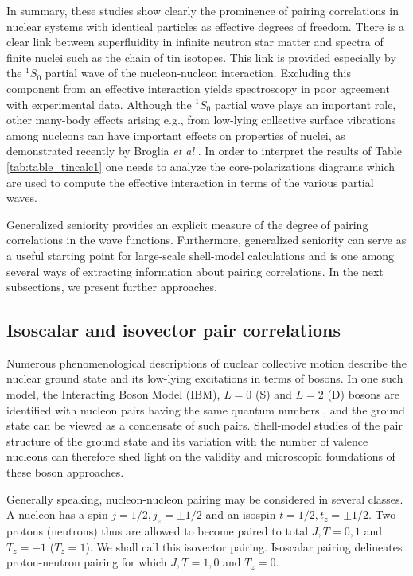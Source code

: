 \documentclass[rmp,aps,floatfix]{revtex4}
\begin{document}
In summary, these studies show clearly the prominence of pairing correlations
in nuclear systems with identical particles as effective degrees of freedom.
There is a clear link between superfluidity in infinite neutron star matter 
and spectra of finite nuclei such as the chain of tin isotopes.
This link is provided especially by the $^1S_0$ partial wave of the 
nucleon-nucleon interaction. Excluding this 
component from an effective interaction yields 
spectroscopy in poor agreement with experimental data.
Although the $^1S_0$ partial wave plays an important role, other many-body
effects arising e.g., from low-lying collective surface vibrations 
among nucleons can have important effects on properties of nuclei,
as demonstrated recently by Broglia {\em et al} 
\cite{broglia1999,broglia2002}. In order to interpret the results
of Table \ref{tab:table_tincalc1} one needs to analyze the core-polarizations
diagrams which are used to compute the effective interaction in terms
of the various partial waves. 

Generalized seniority provides an explicit measure of the degree of 
pairing correlations in the wave functions.  Furthermore, 
generalized seniority can serve as a useful starting point 
for large-scale shell-model calculations and is one among several ways 
of extracting information about pairing correlations. 
In the next subsections, we present further approaches.


\subsection{Isoscalar and isovector pair correlations}
\label{subsec:isoscalarvector}

Numerous phenomenological descriptions of nuclear collective motion describe
the nuclear ground state and its low-lying excitations in terms of bosons.
In one such model, the Interacting Boson Model
(IBM), $L=0$ (S) and $L=2$ (D) bosons are identified with
nucleon pairs having the same quantum numbers \cite{Arima},
and the ground state can be viewed as a condensate of such pairs.  
Shell-model studies of the pair
structure of the ground state and its variation with the number of valence
nucleons can therefore shed light on the validity and microscopic foundations
of these boson approaches. 

Generally speaking, nucleon-nucleon pairing may be
considered in several classes. A nucleon has a spin $j=1/2,j_z=\pm 1/2$ and an 
isospin $t=1/2,t_z=\pm 1/2$. Two protons (neutrons) thus are allowed to 
become paired to total $J,T=0,1$ and $T_z=-1$ ($T_z=1$). We shall 
call this isovector pairing. Isoscalar pairing delineates proton-neutron 
pairing for which $J,T = 1,0$ and $T_z=0$. 
\end{document}

